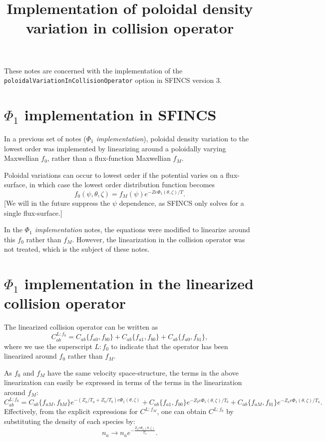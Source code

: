 \documentclass[12pt]{article}
\title{Implementation of poloidal density variation in collision operator}
\begin{document}
\titlepage

\maketitle

These notes are concerned with the implementation of the \texttt{poloidal\-Variation\-In\-Collision\-Operator} option in SFINCS version 3.

\section*{$\Phi_1$ implementation in SFINCS}
In a previous set of notes (\emph{$\Phi_1$ implementation}), poloidal density variation to the lowest order was implemented by linearizing around a poloidally varying Maxwellian $f_0$, rather than a flux-function Maxwellian $f_M$.

Poloidal variations can occur to lowest order if the potential varies on a flux-surface, in which case the lowest order distribution function becomes
\begin{equation}
f_0(\psi,\theta,\zeta) = f_M(\psi) e^{-Ze\Phi_1(\theta,\zeta)/T}.
\end{equation}
[We will in the future suppress the $\psi$ dependence, as SFINCS only solves for a single flux-surface.]

In the \emph{$\Phi_1$ implementation} notes, the equations were modified to linearize around this $f_0$ rather than $f_M$. However, the linearization in the collision operator was not treated, which is the subject of these notes.


\section*{$\Phi_1$ implementation in the linearized collision operator}
The linearized collision operator can be written as
\begin{equation}
C^{L:f_0}_{ab} = C_{ab}\{f_{a0},f_{b0}\} +  C_{ab}\{f_{a1},f_{b0}\} +  C_{ab}\{f_{a0},f_{b1}\},
\end{equation}
where we use the superscript $L:f_0$ to indicate that the operator has been linearized around $f_0$ rather than $f_M$. 

As $f_0$ and $f_M$ have the same velocity space-structure, the terms in the above linearization can easily be expressed in terms of the terms in the linearization around $f_M$:
\begin{equation}
C^{L:f_0}_{ab} =  C_{ab}\{f_{aM},f_{bM}\} e^{-(Z_a/T_a + Z_b/T_b) e\Phi_1(\theta,\zeta)} +  C_{ab}\{f_{a1},f_{b0}\} e^{-Z_b e\Phi_1(\theta,\zeta)/T_b} +  C_{ab}\{f_{aM},f_{b1}\} e^{-Z_a e\Phi_1(\theta,\zeta)/T_a}.
\end{equation}
Effectively, from the explicit expressions for $C^{L:f_M}$, one can obtain $C^{L:f_0}$ by substituting the density of each species by:
\begin{equation}
n_a \to n_a e^{-\frac{Z_a e\Phi_1(\theta,\zeta)}{T_a}}. \label{eq:denssub}
\end{equation}
\end{document}
